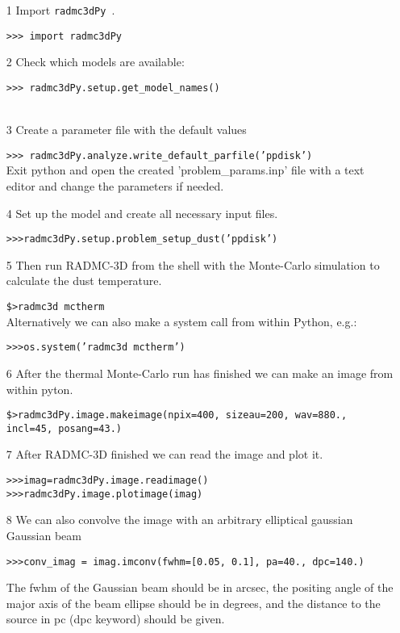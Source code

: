\documentclass[12pt]{article}
\newcommand{\pymod}{{\tt  radmc3dPy }}
\begin{document}
\begin{itemize}
\item[1] Import \pymod.

{\tt >>> import radmc3dPy}\\
\item[2] Check which models are available:

{\tt >>> radmc3dPy.setup.get\_model\_names()}\\
\indent {\tt ['ppdisk']}\\
\item[3] Create a parameter file with the default values

{\tt >>> radmc3dPy.analyze.write\_default\_parfile('ppdisk')}\\

Exit python and open the created 'problem\_params.inp' file with a text editor and change the parameters if needed. 
\item[4] Set up the model and create all necessary input files.

{\tt>>>radmc3dPy.setup.problem\_setup\_dust('ppdisk')}\\
\item[5] Then run RADMC-3D from the shell with the Monte-Carlo simulation to calculate the dust temperature.

{\tt \$>radmc3d mctherm}\\

Alternatively we can also make a system call from within Python, e.g.:

{\tt>>>os.system('radmc3d mctherm')}
\item[6] After the thermal Monte-Carlo run has finished we can make an image from within pyton. 

{\tt \$>radmc3dPy.image.makeimage(npix=400, sizeau=200, wav=880., incl=45, posang=43.)}\\
\item[7] After RADMC-3D finished we can read the image and plot it. 

{\tt>>>imag=radmc3dPy.image.readimage()}\\
{\tt>>>radmc3dPy.image.plotimage(imag)}

\item[8] We can also convolve the image with an arbitrary elliptical gaussian Gaussian beam

{\tt>>>conv\_imag = imag.imconv(fwhm=[0.05, 0.1], pa=40., dpc=140.)}

The fwhm of the Gaussian beam should be in arcsec,  the positing angle of the major axis of the beam ellipse
should be in degrees, and the distance to the source in pc (dpc keyword) should be given. 


\end{itemize}
\end{document}

